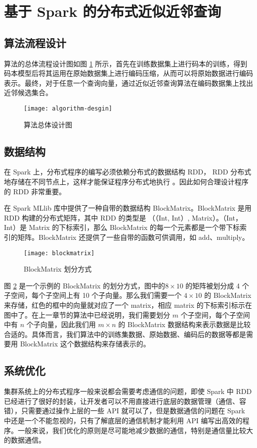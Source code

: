 \section{基于 Spark 的分布式近似近邻查询}
\subsection{算法流程设计}
算法的总体流程设计图如图 \ref{fig:algorithm-desgin} 所示，首先在训练数据集上进行码本的训练，得到码本模型后将其运用在原始数据集上进行编码压缩，从而可以将原始数据进行编码表示。最终，对于任意一个查询向量，通过近似近邻查询算法在编码数据集上找出近邻候选集合。
\begin{figure}[H]
  \centering
  \texttt{[image: algorithm-desgin]}
  \caption{算法总体设计图}
  \label{fig:algorithm-desgin}
\end{figure}
\subsection{数据结构}
在 Spark 上，分布式程序的编写必须依赖分布式的数据结构 RDD， RDD 分布式地存储在不同节点上，这样才能保证程序分布式地执行 。因此如何合理设计程序的 RDD 非常重要。

在 Spark MLlib 库中提供了一种自带的数据结构 BlockMatrix。BlockMatrix 是用 RDD 构建的分布式矩阵，其中 RDD 的类型是 （（Int, Int）, Matrix）。（Int，Int）是 Matrix 的下标索引，那么 BlockMatrix 的每一个元素都是一个带下标索引的矩阵。BlockMatrix 还提供了一些自带的函数可供调用，如 add、multiply。

\begin{figure}[H]
  \centering
  \texttt{[image: blockmatrix]}
  \caption{BlockMatrix 划分方式}
  \label{fig:blockmatrix}
\end{figure}

图 \ref{fig:blockmatrix} 是一个示例的 BlockMatrix 的划分方式，图中的$ 8\times 10$ 的矩阵被划分成 4 个子空间，每个子空间上有 10 个子向量。那么我们需要一个 $4\times 10$ 的 BlockMatrix 来存储，红色的框中的向量就对应了一个 matrix，相应 matrix 的下标索引标示在图中了。在上一章节的算法中已经说明，我们需要划分 $m$ 个子空间，每个子空间中有 $n$ 个子向量，因此我们用 $m\times n$ 的 BlockMatrix 数据结构来表示数据是比较合适的。具体而言，我们算法中的训练集数据、原始数据、编码后的数据等都是需要用 BlockMatrix 这个数据结构来存储表示的。
\subsection{系统优化}
集群系统上的分布式程序一般来说都会需要考虑通信的问题，即使 Spark 中 RDD 已经进行了很好的封装，让开发者可以不用直接进行底层的数据管理（通信、容错），只需要通过操作上层的一些 API 就可以了，但是数据通信的问题在 Spark 中还是一个不能忽视的，只有了解底层的通信机制才能利用 API 编写出高效的程序。一般来说，我们优化的原则是尽可能地减少数据的通信，特别是通信量比较大的数据通信。

